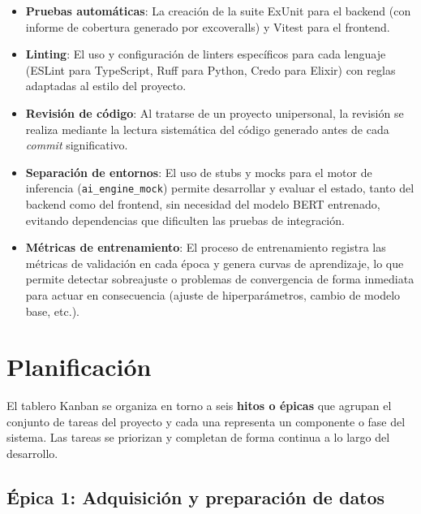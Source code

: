 \begin{itemize}
 \item \textbf{Pruebas automáticas}: La creación de la suite ExUnit para el backend (con informe de cobertura generado por excoveralls) y Vitest para el frontend.
 \item \textbf{Linting}: El uso y configuración de linters específicos para cada lenguaje (ESLint para TypeScript, Ruff para Python, Credo para Elixir) con reglas adaptadas al estilo del proyecto.
 \item \textbf{Revisión de código}: Al tratarse de un proyecto unipersonal, la revisión se realiza mediante la lectura sistemática del código generado antes de cada \emph{commit} significativo.
 \item \textbf{Separación de entornos}: El uso de stubs y mocks para el motor de inferencia (\texttt{ai\_engine\_mock}) permite desarrollar y evaluar el estado, tanto del backend como del frontend, sin necesidad del modelo BERT entrenado, evitando dependencias que dificulten las pruebas de integración.
 \item \textbf{Métricas de entrenamiento}: El proceso de entrenamiento registra las métricas de validación en cada época y genera curvas de aprendizaje, lo que permite detectar sobreajuste o problemas de convergencia de forma inmediata para actuar en consecuencia (ajuste de hiperparámetros, cambio de modelo base, etc.).
\end{itemize}

\section{Planificación}

El tablero Kanban se organiza en torno a seis \textbf{hitos o épicas} que agrupan el conjunto de tareas del proyecto y cada una representa un componente o fase del sistema. Las tareas se priorizan y completan de forma continua a lo largo del desarrollo.

\subsection{Épica 1: Adquisición y preparación de datos}

